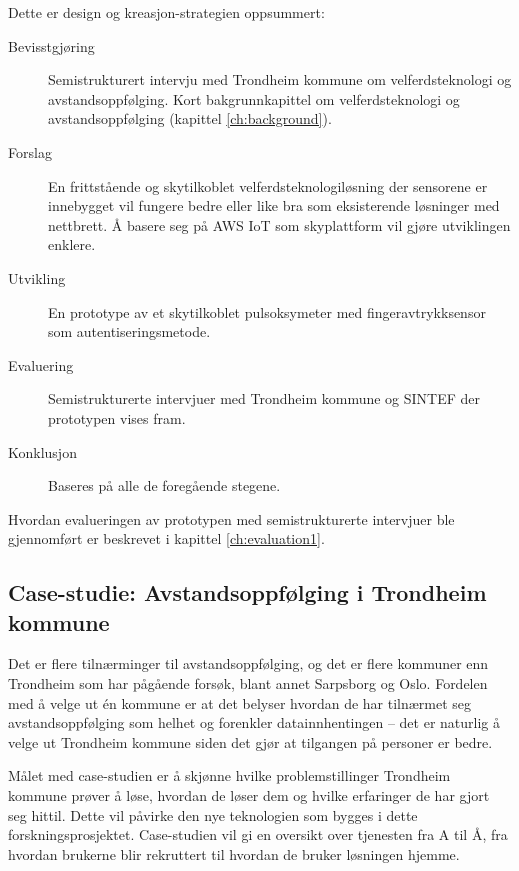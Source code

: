 \begin{minipage}{\linewidth}
Dette er design og kreasjon-strategien oppsummert:\newline

\begin{description}
  \item [Bevisstgjøring] Semistrukturert intervju med Trondheim kommune om velferdsteknologi og avstandsoppfølging. Kort bakgrunnkapittel
      om velferdsteknologi og avstandsoppfølging (kapittel \ref{ch:background}).
  \item [Forslag] En frittstående og skytilkoblet velferdsteknologiløsning der sensorene er innebygget vil fungere bedre
      eller like bra som eksisterende løsninger med nettbrett. Å basere seg på AWS IoT som skyplattform vil gjøre utviklingen enklere.
  \item [Utvikling] En prototype av et skytilkoblet pulsoksymeter med fingeravtrykksensor som autentiseringsmetode.
  \item [Evaluering] Semistrukturerte intervjuer med Trondheim kommune og SINTEF der prototypen vises fram.
  \item [Konklusjon] Baseres på alle de foregående stegene.
\end{description}
\end{minipage}

Hvordan evalueringen av prototypen med semistrukturerte intervjuer ble gjennomført er beskrevet i kapittel \ref{ch:evaluation1}.

\subsection{Case-studie: Avstandsoppfølging i Trondheim kommune}
Det er flere tilnærminger til avstandsoppfølging, og det er flere kommuner enn Trondheim som har pågående forsøk, blant annet
Sarpsborg og Oslo. Fordelen med å velge ut én kommune er at det belyser hvordan de har tilnærmet seg avstandsoppfølging
som helhet og forenkler datainnhentingen -- det er naturlig å velge ut Trondheim kommune siden det gjør at tilgangen på personer er bedre.

Målet med case-studien er å skjønne hvilke problemstillinger Trondheim kommune prøver å løse, hvordan de løser dem og hvilke
erfaringer de har gjort seg hittil. Dette vil påvirke den nye teknologien som bygges i dette forskningsprosjektet. Case-studien
vil gi en oversikt over tjenesten fra A til Å, fra hvordan brukerne blir rekruttert til hvordan de bruker løsningen hjemme.

